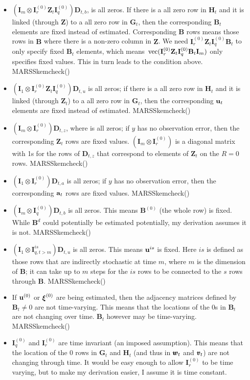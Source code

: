 \documentclass[]{article}
\def\xixi{\mbox{\boldmath $\xi$}}
\def\ZZ{\mbox{$\mathbf Z$}}	\def\zz{\mbox{$\mathbf z$}}
\def\BB{\mbox{$\mathbf B$}}	\def\bb{\mbox{$\mathbf b$}}
\def\DD{\mbox{$\mathbf D$}}	\def\dd{\mbox{$\mathbf d$}}
\def\GG{\mbox{$\mathbf G$}}	\def\gg{\mbox{$\mathbf g$}}
\def\HH{\mbox{$\mathbf H$}}	\def\hh{\mbox{$\mathbf h$}}
\def\II{\mbox{$\mathbf I$}} \def\ii{\mbox{$\mathbf i$}}
\def\vec{\,\textup{\textrm{vec}}}
\begin{document}
\begin{itemize}
\item $(\II_m \otimes \II_r^{(0)}\ZZ_t\II_q^{(0)})\DD_{t,b}$,  is  all zeros. If there is a all zero row in $\HH_t$ and it is linked (through $\ZZ$) to a all zero row in $\GG_t$, then the corresponding $\BB_t$ elements are fixed instead of estimated.  Corresponding $\BB$ rows means those rows in $\BB$ where there is a non-zero column in $\ZZ$.  We need $\II_r^{(0)}\ZZ_t\II_q^{(0)}\BB_t$ to only specify fixed $\BB_t$ elements, which means $\vec(\II_r^{(0)}\ZZ_t\II_q^{(0)}\BB_t\II_m)$ only specifies fixed values.  This in turn leads to the condition above. MARSSkemcheck()
\item $(\II_1 \otimes \II_r^{(0)}\ZZ_t\II_q^{(0)})\DD_{t,u}$ is all zeros;  if there is a all zero row in $\HH_t$ and it is linked (through $\ZZ_t$) to a all zero row in $\GG_t$, then the corresponding $\uu_t$ elements are fixed instead of estimated.  MARSSkemcheck()
\item $(\II_m \otimes \II_r^{(0)})\DD_{t,z}$, where  is  all zeros; if $y$ has no observation error, then the corresponding $\ZZ_t$ rows are fixed values. $(\II_m \otimes \II_r^{(0)})$ is a diagonal matrix with 1s for the rows of $\DD_{t,z}$ that correspond to elements of $\ZZ_t$ on the $R=0$ rows. MARSSkemcheck()
\item $(\II_1 \otimes \II_r^{(0)})\DD_{t,a}$ is all zeros; if $y$ has no observation error, then the corresponding $\aa_t$ rows are fixed values. MARSSkemcheck()
\item $(\II_m \otimes \II_q^{(0)})\DD_{t,b}$ is all zeros.  This means $\BB^{(0)}$ (the whole row) is fixed.  While $\BB^d$ could potentially be estimated potentially, my derivation assumes it is not. MARSSkemcheck()
\item $(\II_1 \otimes \II_{q,t>m}^{is})\DD_{t,u}$ is all zeros.  This means $\uu^{is}$ is fixed.  Here $is$ is defined as those rows that are indirectly stochastic at time $m$, where $m$ is the dimension of $\BB$; it can take up to $m$ steps for the $is$ rows to be connected to the $s$ rows through $\BB$. MARSSkemcheck()
\item If $\uu^{(0)}$ or $\xixi^{(0)}$ are being estimated, then the adjacency matrices defined by $\BB_t \neq 0$ are not time-varying. This means that the locations of the 0s in $\BB_t$ are not changing over time. $\BB_t$ however may be time-varying. MARSSkemcheck()
\item $\II_q^{(0)}$ and $\II_r^{(0)}$ are time invariant (an imposed assumption).  This means that the location of the 0 rows in $\GG_t$ and $\HH_t$ (and thus in $\ww_t$ and $\vv_t$) are not changing through time.  It would be easy enough to allow $\II_r^{(0)}$ to be time varying, but to make my derivation easier, I assume it is time constant.

\end{itemize}
\end{document}

